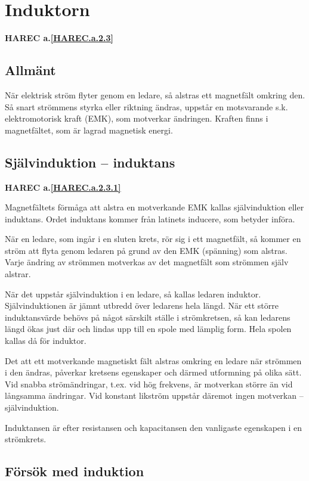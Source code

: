 \section{Induktorn}
\textbf{HAREC a.\ref{HAREC.a.2.3}\label{myHAREC.a.2.3}}

\subsection{Allmänt}

När elektrisk ström flyter genom en ledare, så alstras ett magnetfält omkring
den. Så snart strömmens styrka eller riktning ändras, uppstår en motsvarande
s.k. elektromotorisk kraft (EMK), som motverkar ändringen. Kraften finns i
magnetfältet, som är lagrad magnetisk energi.


\subsection{Självinduktion -- induktans}
\textbf{HAREC a.\ref{HAREC.a.2.3.1}\label{myHAREC.a.2.3.1}}

Magnetfältets förmåga att alstra en motverkande EMK kallas självinduktion eller
induktans. Ordet induktans kommer från latinets inducere, som betyder införa.

När en ledare, som ingår i en sluten krets, rör sig i ett magnetfält, så kommer
en ström att flyta genom ledaren på grund av den EMK (spänning) som alstras.
Varje ändring av strömmen motverkas av det magnetfält som strömmen själv
alstrar.

När det uppstår självinduktion i en ledare, så kallas ledaren induktor.
Självinduktionen är jämnt utbredd över ledarens hela längd. När ett större
induktansvärde behövs på något särskilt ställe i strömkretsen, så kan ledarens
längd ökas just där och lindas upp till en spole med lämplig form.
Hela spolen kallas då för induktor.

Det att ett motverkande magnetiskt fält alstras omkring en ledare när strömmen i
den ändras, påverkar kretsens egenskaper och därmed utformning på olika sätt.
Vid snabba strömändringar, t.ex. vid hög frekvens, är motverkan större än vid
långsamma ändringar.
Vid konstant likström uppstår däremot ingen motverkan -- självinduktion.

Induktansen är efter resistansen och kapacitansen den vanligaste egenskapen i
en strömkrets.

\subsection{Försök med induktion}

